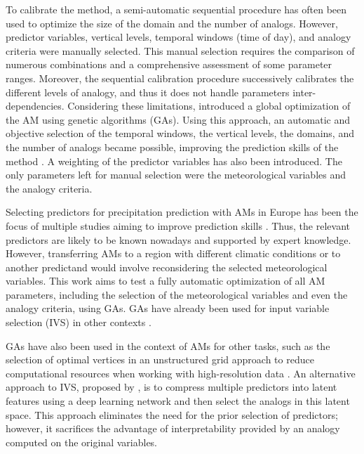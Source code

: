 \documentclass[draft]{agujournal2019}
\begin{document}
To calibrate the method, a semi-automatic sequential procedure \cite{Bontron2004, Radanovics2013, BenDaoud2016} has often been used to optimize the size of the domain and the number of analogs. However, predictor variables, vertical levels, temporal windows (time of day), and analogy criteria were manually selected. This manual selection requires the comparison of numerous combinations and a comprehensive assessment of some parameter ranges. Moreover, the sequential calibration procedure successively calibrates the different levels of analogy, and thus it does not handle parameters inter-dependencies. Considering these limitations,  introduced a global optimization of the AM using genetic algorithms (GAs). Using this approach, an automatic and objective selection of the temporal windows, the vertical levels, the domains, and the number of analogs became possible, improving the prediction skills of the method \cite{Horton2018a}. A weighting of the predictor variables has also been introduced. The only parameters left for manual selection were the meteorological variables and the analogy criteria.

Selecting predictors for precipitation prediction with AMs in Europe has been the focus of multiple studies aiming to improve prediction skills \cite{Obled2002, Bontron2004, Gibergans-Baguena2007, Radanovics2013, BenDaoud2016}. Thus, the relevant predictors are likely to be known nowadays and supported by expert knowledge. However, transferring AMs to a region with different climatic conditions or to another predictand would involve reconsidering the selected meteorological variables. This work aims to test a fully automatic optimization of all AM parameters, including the selection of the meteorological variables and even the analogy criteria, using GAs. GAs have already been used for input variable selection (IVS) in other contexts \cite{Dheygere2003, Huang2007, Cateni2010, Gobeyn2017}.

GAs have also been used in the context of AMs for other tasks, such as the selection of optimal vertices in an unstructured grid approach to reduce computational resources when working with high-resolution data \cite{Hu2019}. An alternative approach to IVS, proposed by , is to compress multiple predictors into latent features using a deep learning network and then select the analogs in this latent space. This approach eliminates the need for the prior selection of predictors; however, it sacrifices the advantage of interpretability provided by an analogy computed on the original variables.
\end{document}
